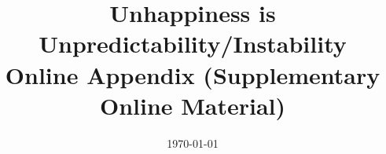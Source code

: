 \documentclass[10pt, letterpaper]{article}
\date{{}\today \hspace{.2in}\xxivtime}
\title{Unhappiness is Unpredictability/Instability\\Online Appendix (Supplementary Online Material)
}
\author{ %
}
\begin{document}


\maketitle
\vspace{-.4in}
\begin{center}

\end{center}





\begin{abstract}
  \noindent


\end{abstract}
\vspace{.15in} 
\vspace{.25in} 
\end{document}
